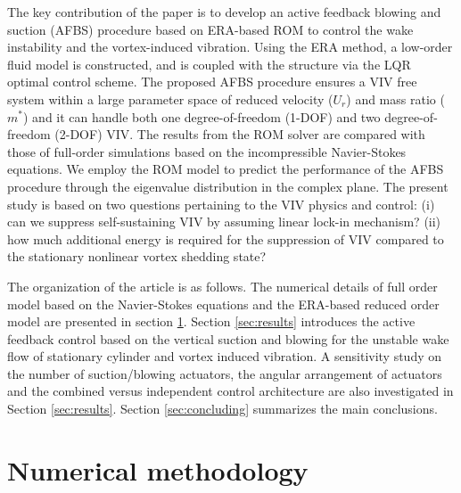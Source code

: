 \documentclass[standard]{jfm}
\begin{document}
The key contribution of the paper is to develop an active feedback blowing and suction (AFBS) procedure based on ERA-based ROM to control the wake instability and the vortex-induced vibration. 
Using the ERA method, a low-order fluid model is constructed, 
and is coupled with the structure via the LQR optimal control scheme. The proposed 
AFBS procedure ensures a VIV free system within a large parameter space of reduced 
velocity ($U_r$) and mass ratio ($m^*$) and it can handle both one degree-of-freedom 
(1-DOF) and two degree-of-freedom (2-DOF) VIV. 
The results from the ROM solver are compared with those of full-order 
simulations based on the incompressible Navier-Stokes equations. 
We employ the ROM model to predict the performance of the AFBS procedure through 
the eigenvalue distribution in the complex plane.
The present study is based on two questions pertaining to the VIV physics and control: 
(i) can we suppress self-sustaining VIV by assuming linear lock-in mechanism?
(ii) how much additional energy is required for the suppression of VIV 
compared to the stationary nonlinear vortex shedding state? 

The organization of the article is as follows.
The numerical details of full order model based on the Navier-Stokes equations and the ERA-based reduced order model are presented in section \ref{sec:method}. 
Section \ref{sec:results} introduces the active feedback control 
based on the vertical suction and blowing for the unstable wake flow 
of stationary cylinder and vortex induced vibration. 
A sensitivity study on the number of 
suction/blowing actuators, the angular arrangement of actuators 
and the  combined versus independent control architecture 
are also investigated in Section \ref{sec:results}. 
Section \ref{sec:concluding} summarizes the main conclusions. 

\section{Numerical methodology}\label{sec:method}
\end{document}
